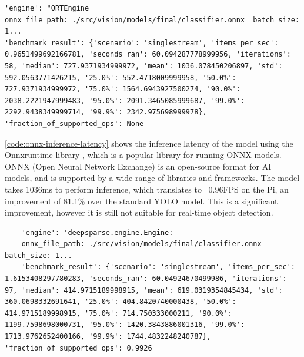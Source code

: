 \begin{minipage}[H]{\textwidth}
  \centering
  \begin{verbatim}
'engine': "ORTEngine
onnx_file_path: ./src/vision/models/final/classifier.onnx  batch_size: 1...
'benchmark_result': {'scenario': 'singlestream', 'items_per_sec': 0.9651499692166781, 'seconds_ran': 60.094287778999956, 'iterations': 58, 'median': 727.9371934999972, 'mean': 1036.078450206897, 'std': 592.0563771426215, '25.0%': 552.4718009999958, '50.0%': 727.9371934999972, '75.0%': 1564.6943927500274, '90.0%': 2038.2221947999483, '95.0%': 2091.3465085999687, '99.0%': 2292.9438349999714, '99.9%': 2342.975698999978}, 'fraction_of_supported_ops': None
  \end{verbatim}
  \label{code:onnx-inference-latency}
\end{minipage}

\autoref{code:onnx-inference-latency} shows the inference latency of the model using the Onnxruntime library \cite{onnxruntime}, which is a popular library for running ONNX models. ONNX (Open Neural Network Exchange) is an open-source format for AI models, and is supported by a wide range of libraries and frameworks. The model takes 1036ms to perform inference, which translates to ~0.96FPS on the Pi, an improvement of 81.1\% over the standard YOLO model. This is a significant improvement, however it is still not suitable for real-time object detection.

\begin{minipage}[H]{\textwidth}
  \centering
  \begin{verbatim}
    'engine': 'deepsparse.engine.Engine:
    onnx_file_path: ./src/vision/models/final/classifier.onnx batch_size: 1...
    'benchmark_result': {'scenario': 'singlestream', 'items_per_sec': 1.6153408297780283, 'seconds_ran': 60.04924670499986, 'iterations': 97, 'median': 414.9715189998915, 'mean': 619.0319354845434, 'std': 360.0698332691641, '25.0%': 404.8420740000438, '50.0%': 414.9715189998915, '75.0%': 714.750333000211, '90.0%': 1199.7598698000731, '95.0%': 1420.3843886001316, '99.0%': 1713.9762652400166, '99.9%': 1744.4832248240787}, 'fraction_of_supported_ops': 0.9926
  \end{verbatim}
  \label{code:deepsparse-inference-latency}
\end{minipage}

